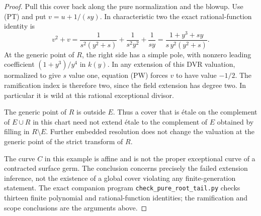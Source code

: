 \begin{proof}
Pull this cover back along the pure normalization and
the blowup.  Use (PT) and put
$v=u+1/(sy)$.  In characteristic two the exact
rational-function identity is
\[
 v^2+v
 =\frac{1}{s^2(y^2+s)}
       +\frac1{s^2y^2}+\frac1{sy}
 =\frac{1+y^3+sy}{s\,y^2(y^2+s)}.                    \tag{PW}
\]
At the generic point of $R$, the right side has a
simple pole, with nonzero leading coefficient
$(1+y^3)/y^4$ in $k(y)$.  In any extension of this
DVR valuation, normalized to give $s$ value one,
equation (PW) forces $v$ to have value $-1/2$.
The ramification index is therefore two, since the
field extension has degree two.  In particular it
is wild at this rational exceptional divisor.

The generic point of $R$ is outside $E$.  Thus a
cover that is \'etale on the complement of $E\cup R$
in this chart need not extend \'etale to the complement
of $E$ obtained by filling in $R\setminus E$.
Further embedded resolution does not change the
valuation at the generic point of the strict
transform of $R$.

The curve $C$ in this example is affine and is not
the proper exceptional curve of a contracted
surface germ.  The conclusion concerns precisely
the failed extension inference, not the existence
of a global cover violating any finite-generation
statement.  The exact companion program
\texttt{check\_pure\_root\_tail.py} checks thirteen
finite polynomial and rational-function identities;
the ramification and scope conclusions are the
arguments above.
\end{proof}
